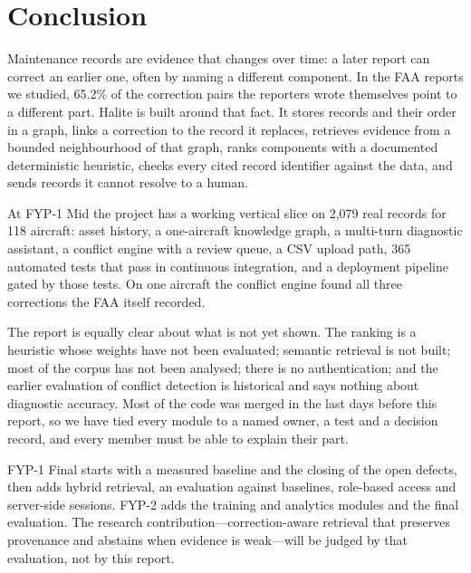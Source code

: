 \chapter{Conclusion}

Maintenance records are evidence that changes over time: a later report can correct an earlier one, often by naming a different component. In the FAA reports we studied, 65.2\% of the correction pairs the reporters wrote themselves point to a different part. Halite is built around that fact. It stores records and their order in a graph, links a correction to the record it replaces, retrieves evidence from a bounded neighbourhood of that graph, ranks components with a documented deterministic heuristic, checks every cited record identifier against the data, and sends records it cannot resolve to a human.

At FYP-1 Mid the project has a working vertical slice on 2{,}079 real records for 118 aircraft: asset history, a one-aircraft knowledge graph, a multi-turn diagnostic assistant, a conflict engine with a review queue, a CSV upload path, 365 automated tests that pass in continuous integration, and a deployment pipeline gated by those tests. On one aircraft the conflict engine found all three corrections the FAA itself recorded.

The report is equally clear about what is not yet shown. The ranking is a heuristic whose weights have not been evaluated; semantic retrieval is not built; most of the corpus has not been analysed; there is no authentication; and the earlier evaluation of conflict detection is historical and says nothing about diagnostic accuracy. Most of the code was merged in the last days before this report, so we have tied every module to a named owner, a test and a decision record, and every member must be able to explain their part.

FYP-1 Final starts with a measured baseline and the closing of the open defects, then adds hybrid retrieval, an evaluation against baselines, role-based access and server-side sessions. FYP-2 adds the training and analytics modules and the final evaluation. The research contribution---correction-aware retrieval that preserves provenance and abstains when evidence is weak---will be judged by that evaluation, not by this report.
